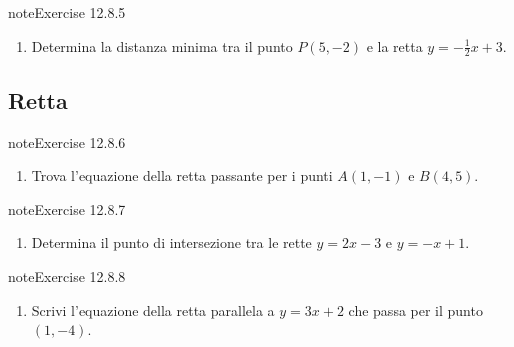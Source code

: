 \documentclass[letterpaper,10pt,italian]{jupyterBook}
\begin{document}
\begin{sphinxadmonition}{note}{Exercise 12.8.5}


\begin{enumerate}
%
\setcounter{enumi}{4}
\item {} 
\sphinxAtStartPar
Determina la distanza minima tra il punto \( P(5, -2) \) e la retta \( y = -\frac{1}{2}x + 3 \).

\end{enumerate}
\end{sphinxadmonition}


\subsection{Retta}
\label{\detokenize{ch/analytic_geometry/analytic_geometry_2d/sol:retta}} \label{exercise:ch/analytic_geometry/analytic_geometry_2d/sol-exercise-5}

\begin{sphinxadmonition}{note}{Exercise 12.8.6}


\begin{enumerate}
%
\setcounter{enumi}{5}
\item {} 
\sphinxAtStartPar
Trova l’equazione della retta passante per i punti \( A(1, -1) \) e \( B(4, 5) \).

\end{enumerate}
\end{sphinxadmonition}
 \label{exercise:ch/analytic_geometry/analytic_geometry_2d/sol-exercise-6}

\begin{sphinxadmonition}{note}{Exercise 12.8.7}


\begin{enumerate}
%
\setcounter{enumi}{6}
\item {} 
\sphinxAtStartPar
Determina il punto di intersezione tra le rette \( y = 2x - 3 \) e \( y = -x + 1 \).

\end{enumerate}
\end{sphinxadmonition}
 \label{exercise:ch/analytic_geometry/analytic_geometry_2d/sol-exercise-7}

\begin{sphinxadmonition}{note}{Exercise 12.8.8}


\begin{enumerate}
%
\setcounter{enumi}{7}
\item {} 
\sphinxAtStartPar
Scrivi l’equazione della retta parallela a \( y = 3x + 2 \) che passa per il punto \( (1, -4) \).

\end{enumerate}
\end{sphinxadmonition}
 \label{exercise:ch/analytic_geometry/analytic_geometry_2d/sol-exercise-8}
\end{document}
